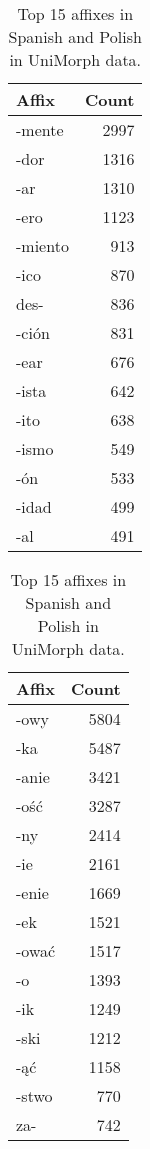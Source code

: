\documentclass[12pt]{article}
\begin{document}
\begin{table}[ht]
\centering
\label{tbl:affixes}
\begin{minipage}[t]{0.48\textwidth}
\centering
{}
\begin{tabular}{lr}
\toprule
\textbf{Affix} & \textbf{Count} \\
\midrule
-mente  & 2997 \\
-dor    & 1316 \\
-ar     & 1310 \\
-ero    & 1123 \\
-miento & 913  \\
-ico    & 870  \\
des-    & 836  \\
-ción   & 831  \\
-ear    & 676  \\
-ista   & 642  \\
-ito    & 638  \\
-ismo   & 549  \\
-ón     & 533  \\
-idad   & 499  \\
-al     & 491  \\
\bottomrule
\end{tabular}
\end{minipage}
\hfill
\begin{minipage}[t]{0.48\textwidth}
\centering
{}
\begin{tabular}{lr}
\toprule
\textbf{Affix} & \textbf{Count} \\
\midrule
-owy   & 5804 \\
-ka    & 5487 \\
-anie  & 3421 \\
-ość  & 3287 \\
-ny    & 2414 \\
-ie    & 2161 \\
-enie  & 1669 \\
-ek    & 1521 \\
-ować  & 1517 \\
-o     & 1393 \\
-ik    & 1249 \\
-ski   & 1212 \\
-ąć   & 1158 \\
-stwo  & 770  \\
za-    & 742  \\
\bottomrule
\end{tabular}
\end{minipage}
\caption{Top 15 affixes in Spanish and Polish in UniMorph data.}
\end{table}
\end{document}
